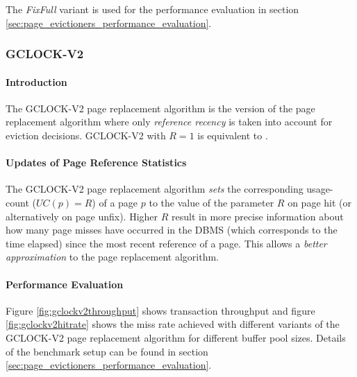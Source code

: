     The \emph{FixFull} variant is used for the performance evaluation in section \ref{sec:page_evictioners_performance_evaluation}.

\subsubsection{GCLOCK-V2} \label{subsubsec:gclock-v2}

\paragraph{Introduction}

    The GCLOCK-V2 page replacement algorithm is the version of the  page replacement algorithm where only \emph{reference recency} is taken into account for eviction decisions. GCLOCK-V2 with $R = 1$ is equivalent to .

\paragraph{Updates of Page Reference Statistics}

    The GCLOCK-V2 page replacement algorithm \emph{sets} the corresponding usage-count ($UC\left(p\right) = R$) of a page $p$ to the value of the parameter $R$ on page hit (or alternatively on page unfix). Higher $R$ result in more precise information about how many page misses have occurred in the DBMS (which corresponds to the time elapsed) since the most recent reference of a page. This allows a \emph{better approximation} to the  page replacement algorithm.

\paragraph{Performance Evaluation}

    Figure \ref{fig:gclockv2throughput} shows transaction throughput and figure \ref{fig:gclockv2hitrate} shows the miss rate achieved with different variants of the GCLOCK-V2 page replacement algorithm for different buffer pool sizes. Details of the benchmark setup can be found in section \ref{sec:page_evictioners_performance_evaluation}.

